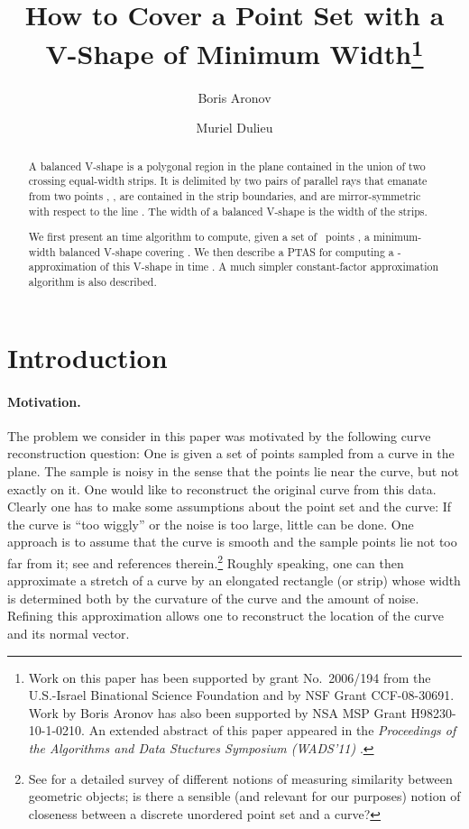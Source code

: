 \documentclass{llncs}
\title{How to Cover a Point Set with a V-Shape of Minimum Width\thanks{Work on this paper has been supported by grant No.~2006/194
    from the U.S.-Israel Binational Science Foundation and by NSF
    Grant CCF-08-30691.  Work by Boris Aronov has also been supported
    by NSA MSP Grant H98230-10-1-0210.  An extended abstract of this
    paper appeared in the \emph{Proceedings of the Algorithms and Data
      Stuctures Symposium (WADS'11)} \cite{AD11}.}}
\author{Boris Aronov \and Muriel Dulieu}
\institute{Department of Computer Science and Engineering, Polytechnic 
 Institute of NYU, Brooklyn, NY~11201-3840, USA;
 \email{aronov@poly.edu}, \email{mdulieu@gmail.com}}
\begin{document}
\maketitle
\pagestyle{plain}
\thispagestyle{plain}
\begin{abstract}
  A balanced V-shape is a polygonal region in the plane contained in
  the union of two crossing equal-width strips.  
  It is delimited by two pairs of parallel rays that emanate from two points
  , , are contained in the strip boundaries, and are mirror-symmetric with respect to the line .
   The width of a balanced V-shape is the width of the strips.
   
  We first present an  time algorithm to compute, given
  a set of ~points , a minimum-width balanced V-shape covering
  .
We then describe a PTAS for computing a -approximation of
  this V-shape in time .
  A much simpler constant-factor approximation algorithm is also described.
\end{abstract}


\section{Introduction}
\label{sec:introduction}

\paragraph*{Motivation.}
The problem we consider in this paper was motivated by the following
curve reconstruction question: One is given a set of points sampled
from a curve in the plane.  The sample is noisy in the sense that
the points lie near the curve, but not exactly on it.  One would like to
reconstruct the original curve from this data.  Clearly one has to
make some assumptions about the point set and the curve: If the curve is
``too wiggly'' or the noise is too large, little can be done.  One
approach is to assume that the curve is smooth and the sample points
lie not too far from it; see \cite{curve-noisy,curve-dey} and
references therein.\footnote{See \cite{alt-guibas-survey} for a detailed survey of different
  notions of measuring similarity between geometric objects;
  is there a sensible (and relevant for our purposes) notion of
  closeness between a discrete unordered point set and a curve?}
Roughly speaking, one can then approximate a stretch of a curve by an
elongated rectangle (or strip) whose width is determined both by the
curvature of the curve and the amount of noise.  Refining this
approximation allows one to reconstruct the location of the curve and
its normal vector.
\end{document}
